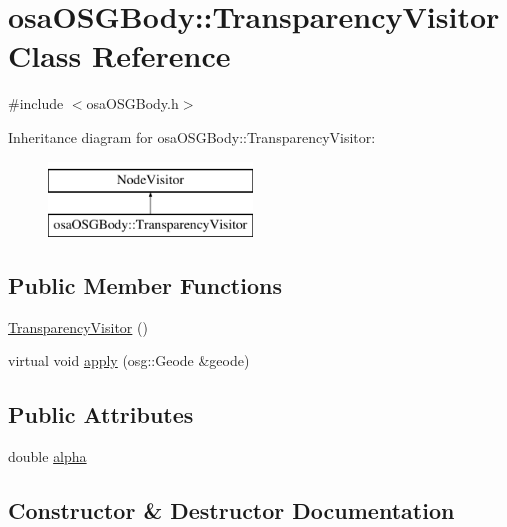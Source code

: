 \hypertarget{classosa_o_s_g_body_1_1_transparency_visitor}{}\section{osa\+O\+S\+G\+Body\+:\+:Transparency\+Visitor Class Reference}
\label{classosa_o_s_g_body_1_1_transparency_visitor}


{\ttfamily \#include $<$osa\+O\+S\+G\+Body.\+h$>$}

Inheritance diagram for osa\+O\+S\+G\+Body\+:\+:Transparency\+Visitor\+:\begin{figure}[H]
\begin{center}
\leavevmode
\includegraphics[height=2.000000cm]{d6/d25/classosa_o_s_g_body_1_1_transparency_visitor}
\end{center}
\end{figure}
\subsection*{Public Member Functions}
\begin{DoxyCompactItemize}
\item 
\hyperlink{classosa_o_s_g_body_1_1_transparency_visitor_a9b36258a2630e33d594373a89d15d5d3}{Transparency\+Visitor} ()
\item 
virtual void \hyperlink{classosa_o_s_g_body_1_1_transparency_visitor_a033c85d79013e1286e822032f874d1ea}{apply} (osg\+::\+Geode \&geode)
\end{DoxyCompactItemize}
\subsection*{Public Attributes}
\begin{DoxyCompactItemize}
\item 
double \hyperlink{classosa_o_s_g_body_1_1_transparency_visitor_aabab059cd7dd7058766317aef52fc86c}{alpha}
\end{DoxyCompactItemize}


\subsection{Constructor \& Destructor Documentation}
\hypertarget{classosa_o_s_g_body_1_1_transparency_visitor_a9b36258a2630e33d594373a89d15d5d3}{}
